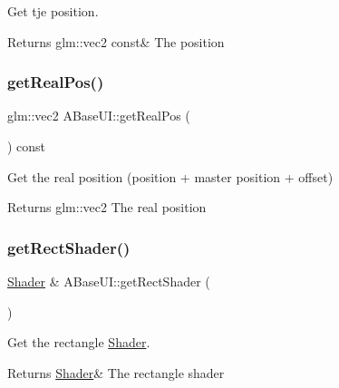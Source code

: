 Get tje position. 

\begin{DoxyReturn}{Returns}
glm\+::vec2 const\& The position 
\end{DoxyReturn}
\mbox{\label{class_a_base_u_i_a0a2e25b071fe59343e2df625482cbb0f}} 
\subsubsection{\texorpdfstring{get\+Real\+Pos()}{getRealPos()}}
{\footnotesize\ttfamily glm\+::vec2 A\+Base\+U\+I\+::get\+Real\+Pos (\begin{DoxyParamCaption}{ }\end{DoxyParamCaption}) const\hspace{0.3cm}{\ttfamily [virtual]}}



Get the real position (position + master position + offset) 

\begin{DoxyReturn}{Returns}
glm\+::vec2 The real position 
\end{DoxyReturn}
\mbox{\label{class_a_base_u_i_af35bc7778b3d140b8ebf632b9c9ef29b}} 
\subsubsection{\texorpdfstring{get\+Rect\+Shader()}{getRectShader()}}
{\footnotesize\ttfamily \hyperlink{class_shader}{Shader} \& A\+Base\+U\+I\+::get\+Rect\+Shader (\begin{DoxyParamCaption}{ }\end{DoxyParamCaption})\hspace{0.3cm}{\ttfamily [static]}}



Get the rectangle \hyperlink{class_shader}{Shader}. 

\begin{DoxyReturn}{Returns}
\hyperlink{class_shader}{Shader}\& The rectangle shader 
\end{DoxyReturn}
\mbox{\label{class_a_base_u_i_a37f4e73da2daf08bf977077f3e827689}} 
